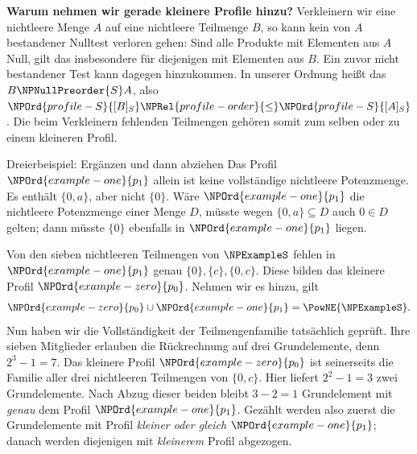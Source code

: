 \medskip\noindent\textbf{Warum nehmen wir gerade kleinere Profile hinzu?}
Verkleinern wir eine nichtleere Menge \(A\) auf eine nichtleere
Teilmenge \(B\), so kann kein von \(A\) bestandener Nulltest
verloren gehen: Sind alle Produkte mit Elementen aus \(A\) Null,
gilt das insbesondere für diejenigen mit Elementen aus \(B\).
Ein zuvor nicht bestandener Test kann dagegen hinzukommen.
In unserer Ordnung heißt das \(B\NPNullPreorder{S} A\), also
\(\NPOrd{profile-S}{[B]_S}\NPRel{profile-order}{\le}\NPOrd{profile-S}{[A]_S}\). Die beim Verkleinern fehlenden Teilmengen
gehören somit zum selben oder zu einem kleineren Profil.

\begin{NPReadingExample}{Dreierbeispiel: Ergänzen und dann abziehen}
Das Profil \(\NPOrd{example-one}{p_1}\) allein ist keine vollständige nichtleere
Potenzmenge. Es enthält \(\{0,a\}\), aber nicht \(\{0\}\).
Wäre \(\NPOrd{example-one}{p_1}\) die nichtleere Potenzmenge einer Menge \(D\), müsste
wegen \(\{0,a\}\subseteq D\) auch \(0\in D\) gelten; dann
müsste \(\{0\}\) ebenfalls in \(\NPOrd{example-one}{p_1}\) liegen.

Von den sieben nichtleeren Teilmengen von \(\NPExampleS\) fehlen in \(\NPOrd{example-one}{p_1}\)
genau \(\{0\},\{c\},\{0,c\}\). Diese bilden das kleinere Profil
\(\NPOrd{example-zero}{p_0}\). Nehmen wir es hinzu, gilt
\[
 \NPOrd{example-zero}{p_0}\cup \NPOrd{example-one}{p_1}=\PowNE{\NPExampleS}.
\]
Nun haben wir die Vollständigkeit der Teilmengenfamilie tatsächlich
geprüft. Ihre sieben Mitglieder erlauben die Rückrechnung auf drei
Grundelemente, denn \(2^3-1=7\). Das kleinere Profil \(\NPOrd{example-zero}{p_0}\) ist
seinerseits die Familie aller drei nichtleeren Teilmengen von
\(\{0,c\}\). Hier liefert \(2^2-1=3\) zwei Grundelemente.
Nach Abzug dieser beiden bleibt \(3-2=1\) Grundelement mit
\emph{genau} dem Profil \(\NPOrd{example-one}{p_1}\). Gezählt werden also zuerst die
Grundelemente mit Profil \emph{kleiner oder gleich} \(\NPOrd{example-one}{p_1}\);
danach werden diejenigen mit \emph{kleinerem} Profil abgezogen.
\end{NPReadingExample}


